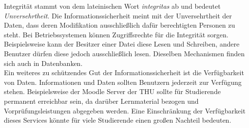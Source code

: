 \documentclass[
    12pt, %
    DIV10,
    ngerman, %
    a4paper, %
    oneside, %
    titlepage, %
    parskip=half, %
    headings=normal, %
    listof=totoc, %
    bibliography=totoc, %
    index=totoc, %
    captions=tableheading, %
    final %
]{scrreprt}
\begin{document}
Integrität stammt von dem lateinischen Wort \emph{integritas} ab und bedeutet \emph{Unversehrtheit}. Die Informationssicherheit meint mit der Unversehrtheit der Daten, dass deren Modifikation ausschlie{\ss}lich dafür berechtigten Personen zu steht. Bei Betriebssystemen können Zugriffsrechte für die Integrität sorgen. Beispielsweise kann der Besitzer einer Datei diese Lesen und Schreiben, andere Benutzer dürfen diese jedoch ausschlie{\ss}lich lesen. Dieselben Mechanismen finden sich auch in Datenbanken.\\
Ein weiteres zu schützendes Gut der Informationssicherheit ist die Verfügbarkeit von Daten. Informationen und Daten sollten Benutzern jederzeit zur Verfügung stehen. Beispielsweise der Moodle Server der THU sollte für Studierende permanent erreichbar sein, da darüber Lernmaterial bezogen und Vorprüfungsleistungen abgegeben werden. Eine Einschränkung der Verfügbarkeit dieses Services könnte für viele Studierende einen gro{\ss}en Nachteil bedeuten.\\\\
\end{document}
